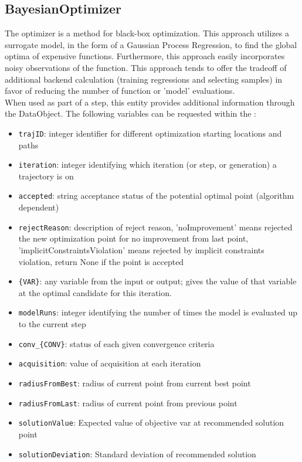 \subsection{BayesianOptimizer}
  The  optimizer is a method for black-box optimization.
  This approach utilizes a surrogate model, in the form of a Gaussian Process Regression,
  to find the global optima of expensive functions. Furthermore, this approach easily
  incorporates noisy observations of the function. This approach tends to offer the
  tradeoff of additional backend calculation (training regressions and selecting samples) in
  favor of reducing the number of function or 'model' evaluations.
\vspace{7pt} \\When used as part of a  step, this entity provides
        additional information through the  DataObject. The
        following variables can be requested within the :
        \begin{itemize}
          \item \texttt{trajID}: integer identifier for different optimization starting locations and paths
             \item \texttt{iteration}: integer identifying which iteration (or step, or generation) a trajectory is on
             \item \texttt{accepted}: string acceptance status of the potential optimal point (algorithm dependent)
             \item \texttt{rejectReason}: description of reject reason, 'noImprovement' means rejected the new optimization point for no improvement from last point, 'implicitConstraintsViolation' means rejected by implicit constraints violation, return None if the point is accepted
             \item \texttt{\{VAR\}}: any variable from the  input or output; gives the value of that variable at the optimal candidate for this iteration.
             \item \texttt{modelRuns}: integer identifying the number of times the model is evaluated up to the current step
             \item \texttt{conv\_\{CONV\}}: status of each given convergence criteria
             \item \texttt{acquisition}: value of acquisition at each iteration
             \item \texttt{radiusFromBest}: radius of current point from current best point
             \item \texttt{radiusFromLast}: radius of current point from previous point
             \item \texttt{solutionValue}: Expected value of objective var at recommended solution point
             \item \texttt{solutionDeviation}: Standard deviation of recommended solution

         \end{itemize}

